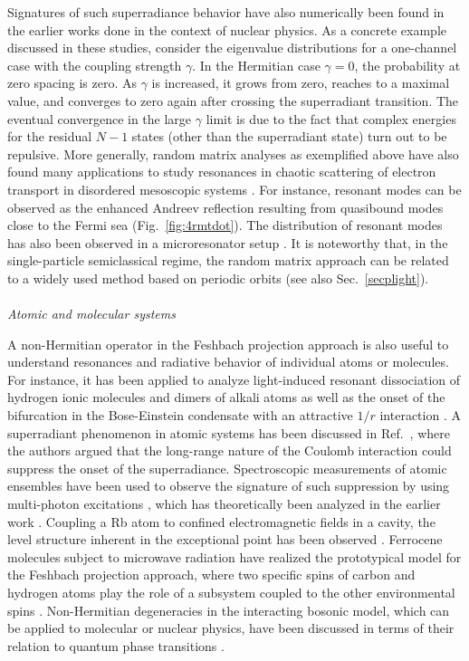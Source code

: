 \documentclass{tADP2e}
\theoremstyle{plain}
\theoremstyle{plain}
\theoremstyle{definition}
\begin{document}
Signatures of such superradiance behavior have also numerically been found in the earlier works \cite{MPA68,KP85} done in the context of nuclear physics. 
As a concrete example discussed in these studies, consider the eigenvalue distributions for a one-channel case with the coupling strength $\gamma$. In the Hermitian case $\gamma=0$, the probability at zero spacing is zero.
As $\gamma$ is increased, it  grows from zero, reaches to a maximal value, and converges to zero again after crossing the superradiant transition. The eventual convergence in the large $\gamma$ limit is due to the fact that  complex energies for the residual $N-1$ states (other than the superradiant state) turn out to be repulsive. 
More generally, random matrix analyses as exemplified above have also found many applications to study resonances in chaotic scattering of electron transport in disordered mesoscopic systems \cite{BCWJ97,AY00}. 
For instance, resonant modes can be observed as the enhanced Andreev reflection resulting from quasibound modes close to the Fermi sea \cite{Pikulin_2012} (Fig.~\ref{fig:4rmtdot}). 
The distribution of resonant modes has also been observed in a microresonator setup \cite{KU08}.
It is noteworthy that, in the single-particle semiclassical regime, the random matrix approach can be related \cite{CHL91} to a widely used method based on periodic orbits \cite{GM90} (see also Sec.~\ref{secplight}). 
 \\ \\ {\it Atomic and molecular systems}
 
 \vspace{3pt}
\noindent
A non-Hermitian operator in the Feshbach projection approach is also useful to understand resonances and radiative behavior of individual atoms or molecules. 
For instance, it has been applied to analyze light-induced resonant dissociation of hydrogen ionic molecules and dimers of alkali atoms \cite{SVV08} as well as the onset of the bifurcation in the Bose-Einstein condensate with an attractive $1/r$ interaction \cite{CH08}.
A superradiant phenomenon in atomic systems has been discussed in Ref.~\cite{FVV96}, where the authors argued that the long-range nature of the Coulomb interaction could suppress the onset of the superradiance. Spectroscopic measurements of atomic ensembles have been used to observe the signature of such suppression  by using multi-photon excitations \cite{AM96}, which has theoretically been analyzed in the earlier work \cite{DG90}.
Coupling a Rb atom to confined electromagnetic fields in a cavity, the level structure inherent in the exceptional point has been observed \cite{CY10}. Ferrocene molecules subject to microwave radiation have realized the prototypical model for the Feshbach projection approach, where two specific spins of carbon and hydrogen atoms play the role of a subsystem coupled to the other environmental spins \cite{AGA06,DAD08}. Non-Hermitian degeneracies in the interacting bosonic model, which can be applied to molecular or nuclear physics, have been discussed in terms of their relation to quantum phase transitions \cite{CP072}.
\end{document}
